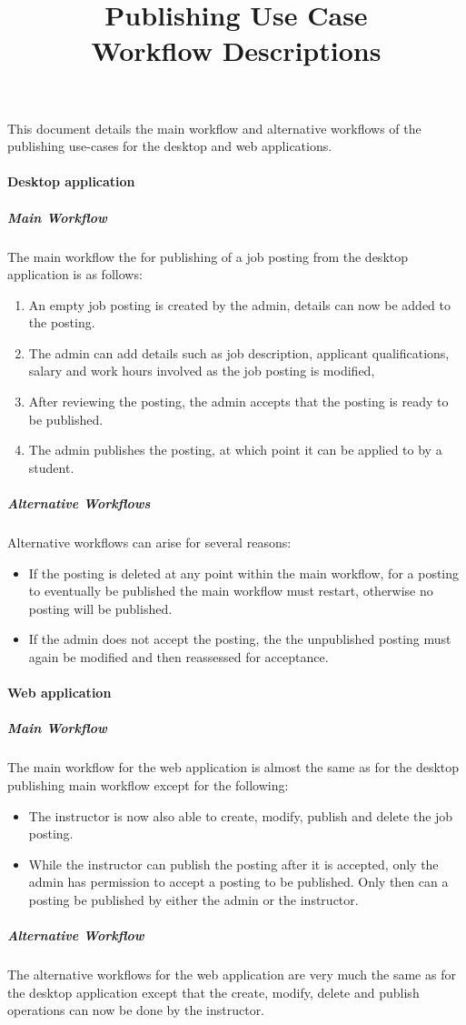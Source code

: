 \documentclass[12pt]{article}
\title{Publishing Use Case \\ Workflow Descriptions}
\date{}
\begin{document}
	\maketitle
		This document details the main workflow and alternative workflows of the publishing use-cases for the desktop and web applications.
	\paragraph {Desktop application}
		\subparagraph{Main Workflow\\}
			The main workflow the for publishing of a job posting from the desktop application is as follows:
			\begin{enumerate}
				\item An empty job posting is created by the admin, details can now be added to the posting.
				\item The admin can add details such as job description, applicant qualifications, salary and work hours involved as the job posting is modified,
				\item After reviewing the posting, the admin accepts that the posting is ready to be published.
				\item The admin publishes the posting, at which point it can be applied to by a student.
			\end{enumerate}
		\subparagraph{Alternative Workflows\\}
			Alternative workflows can arise for several reasons:
			\begin{itemize}
				\item If the posting is deleted at any point within the main workflow, for a posting to eventually be published the main workflow must restart, otherwise no posting will be published.
				\item If the admin does not accept the posting, the the unpublished posting must again be modified and then reassessed for acceptance.
			\end{itemize}

	\paragraph{Web application}
		\subparagraph{Main Workflow\\}
			The main workflow for the web application is almost the same as for the desktop publishing main workflow except for the following:
			\begin{itemize}
				\item The instructor is now also able to create, modify, publish and delete the job posting.
				\item While the instructor can publish the posting after it is accepted, only the admin has permission to accept a posting to be published. Only then can a posting be published by either the admin or the instructor. 
			\end{itemize}
				
		\subparagraph{Alternative Workflow\\}
			The alternative workflows for the web application are very much the same as for the desktop application except that the create, modify, delete and publish operations can now be done by the instructor.

			
\end{document}
